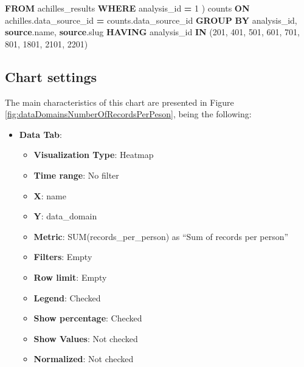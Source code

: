 \documentclass[
]{book}
\newenvironment{Shaded}{\begin{snugshade}}{\end{snugshade}}
\newcommand{\DecValTok}[1]{\textcolor[rgb]{0.00,0.00,0.81}{#1}}
\newcommand{\KeywordTok}[1]{\textcolor[rgb]{0.13,0.29,0.53}{\textbf{#1}}}
\newcommand{\NormalTok}[1]{#1}
\newcommand{\OperatorTok}[1]{\textcolor[rgb]{0.81,0.36,0.00}{\textbf{#1}}}
\providecommand{\tightlist}{%
  \setlength{\itemsep}{0pt}\setlength{\parskip}{0pt}}
\begin{document}
\begin{Shaded}
\begin{Highlighting}[]
        \KeywordTok{FROM}\NormalTok{ achilles\_results }
        \KeywordTok{WHERE}\NormalTok{ analysis\_id }\OperatorTok{=} \DecValTok{1}
\NormalTok{        ) counts }\KeywordTok{ON} 
\NormalTok{      achilles.data\_source\_id }\OperatorTok{=}\NormalTok{ counts.data\_source\_id }
\KeywordTok{GROUP} \KeywordTok{BY}\NormalTok{ analysis\_id, }\KeywordTok{source}\NormalTok{.name, }\KeywordTok{source}\NormalTok{.slug}
\KeywordTok{HAVING}\NormalTok{ analysis\_id }\KeywordTok{IN}\NormalTok{ (}\DecValTok{201}\NormalTok{, }\DecValTok{401}\NormalTok{, }\DecValTok{501}\NormalTok{, }\DecValTok{601}\NormalTok{, }\DecValTok{701}\NormalTok{, }\DecValTok{801}\NormalTok{, }\DecValTok{1801}\NormalTok{, }\DecValTok{2101}\NormalTok{, }
    \DecValTok{2201}\NormalTok{)}
\end{Highlighting}
\end{Shaded}

\hypertarget{chart-settings-23}{%
\subsection{Chart settings}\label{chart-settings-23}}

The main characteristics of this chart are presented in Figure \ref{fig:dataDomainsNumberOfRecordsPerPeson}, being the following:

\begin{itemize}
\tightlist
\item
  \textbf{Data Tab}:

  \begin{itemize}
  \tightlist
  \item
    \textbf{Visualization Type}: Heatmap
  \item
    \textbf{Time range}: No filter
  \item
    \textbf{X}: name
  \item
    \textbf{Y}: data\_domain
  \item
    \textbf{Metric}: SUM(records\_per\_person) as ``Sum of records per person''
  \item
    \textbf{Filters}: Empty
  \item
    \textbf{Row limit}: Empty
  \item
    \textbf{Legend}: Checked
  \item
    \textbf{Show percentage}: Checked
  \item
    \textbf{Show Values}: Not checked
  \item
    \textbf{Normalized}: Not checked
  \end{itemize}
\end{itemize}
\end{document}
